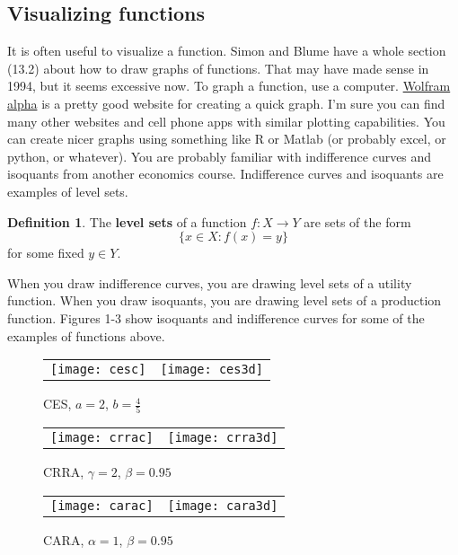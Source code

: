 \documentclass[12pt,reqno]{amsart}
\theoremstyle{definition}
\newtheorem{definition}{Definition}[section]
\renewcommand{\to}{{\rightarrow}}
\begin{document}
\subsection{Visualizing functions}
It is often useful to visualize a function. Simon and Blume have a
whole section (13.2) about how to draw graphs of functions. That may
have made sense in 1994, but it seems excessive now. To graph a
function, use a computer. \href{http://wolframalpha.com}{Wolfram
  alpha} is a pretty good website for creating a quick graph.  I'm
sure you can find many other websites and cell phone apps with similar
plotting capabilities. You can create nicer graphs using something
like R or Matlab (or probably excel, or python, or whatever).  You are
probably familiar with indifference curves and isoquants from another
economics course. Indifference curves and isoquants are examples of
level sets.
\begin{definition}
  The \textbf{level sets} of a function $f:X\to Y$ are sets of the
  form 
  \[ \{ x \in X: f(x) = y \} \]
  for some fixed $y \in Y$.
\end{definition}
When you draw indifference curves, you are drawing level sets of a
utility function. When you draw isoquants, you are drawing level sets
of a production function. Figures 1-3 show isoquants and indifference
curves for some of the examples of functions above. 

\begin{figure}
  \caption{CES, $a = 2$, $b = \frac{4}{5}$}
  \begin{tabular}{cc}
    \texttt{[image: cesc]} &
    \texttt{[image: ces3d]} 
  \end{tabular}
\end{figure}

\begin{figure}
  \caption{CRRA, $\gamma = 2$, $\beta = 0.95$}
  \begin{tabular}{cc}
    \texttt{[image: crrac]} &
    \texttt{[image: crra3d]} 
  \end{tabular}
\end{figure}

\begin{figure}
  \caption{CARA, $\alpha = 1$, $\beta = 0.95$}
  \begin{tabular}{cc}
    \texttt{[image: carac]} &
    \texttt{[image: cara3d]} 
  \end{tabular}
\end{figure}
\end{document}
